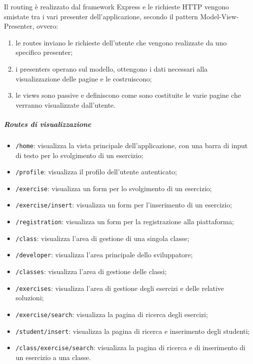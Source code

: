 \noindent Il routing è realizzato dal framework Express e le richieste HTTP vengono smistate tra i vari presenter dell'applicazione, secondo il pattern Model-View-Presenter, ovvero:
\begin{enumerate}
	\item le routes inviano le richieste dell'utente che vengono realizzate da uno specifico presenter;
	\item i presenters operano sul modello, ottengono i dati necessari alla visualizzazione delle pagine e le costruiscono;
	\item le views sono passive e definiscono come sono costituite le varie pagine che verranno visualizzate dall'utente.
\end{enumerate}

\subparagraph*{Routes di visualizzazione}
\begin{itemize}
	\item \texttt{/home}: visualizza la vista principale dell'applicazione, con una barra di input di testo per lo svolgimento di un esercizio;
	\item \texttt{/profile}: visualizza il profilo dell'utente autenticato;
	\item \texttt{/exercise}: visualizza un form per lo svolgimento di un esercizio;
	\item \texttt{/exercise/insert}: visualizza un form per l'inserimento di un esercizio;
	\item \texttt{/registration}: visualizza un form per la registrazione alla piattaforma;
	\item \texttt{/class}: visualizza l'area di gestione di una singola classe;
	\item \texttt{/developer}: visualizza l'area principale dello sviluppatore;
	\item \texttt{/classes}: visualizza l'area di gestione delle classi;
	\item \texttt{/exercises}: visualizza l'area di gestione degli esercizi e delle relative soluzioni;
	\item \texttt{/exercise/search}: visualizza la pagina di ricerca degli esercizi;
	\item \texttt{/student/insert}: visualizza la pagina di ricerca e inserimento degli studenti;
	\item \texttt{/class/exercise/search}: visualizza la pagina di ricerca e di inserimento di un esercizio a una classe.
\end{itemize}


